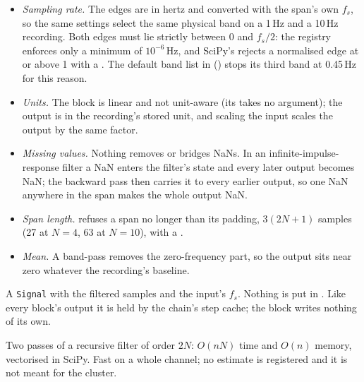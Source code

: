 \begin{itemize}
\item \emph{Sampling rate.} The edges are in hertz and converted with the span's own $f_s$, so
  the same settings select the same physical band on a 1\,Hz and a 10\,Hz recording. Both edges
  must lie strictly between 0 and $f_s/2$: the registry enforces only a minimum of
  $10^{-6}$\,Hz, and SciPy's  rejects a normalised edge at or above 1 with a
  . The default band list in 
  () stops its third band at 0.45\,Hz for this reason.
\item \emph{Units.} The block is linear and not unit-aware (its  takes no
   argument); the output is in the recording's stored unit, and scaling the input
  scales the output by the same factor.
\item \emph{Missing values.} Nothing removes or bridges NaNs. In an infinite-impulse-response
  filter a NaN enters the filter's state and every later output becomes NaN; the backward pass
  then carries it to every earlier output, so one NaN anywhere in the span makes the whole
  output NaN. 
\item \emph{Span length.}  refuses a span no longer than its padding,
  $3(2N+1)$ samples (27 at $N = 4$, 63 at $N = 10$), with a .
\item \emph{Mean.} A band-pass removes the zero-frequency part, so the output sits near zero
  whatever the recording's baseline.
\end{itemize}

A \texttt{Signal} with the filtered samples and the input's $f_s$. Nothing is put in
. Like every block's output it is held by the chain's step cache; the block writes
nothing of its own.

Two passes of a recursive filter of order $2N$: $O(nN)$ time and $O(n)$ memory, vectorised in
SciPy. Fast on a whole channel; no estimate is registered and it is not meant for the cluster.

